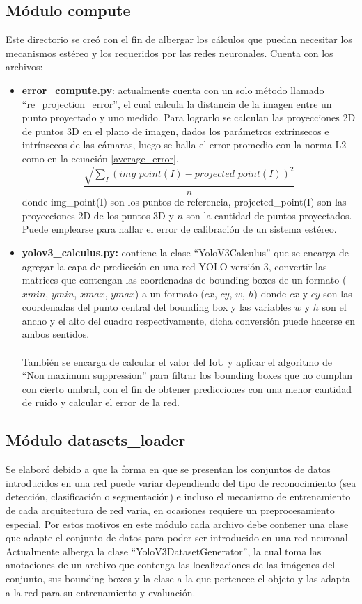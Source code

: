 \subsection{Módulo compute}
Este directorio se creó con el fin de albergar los cálculos que puedan necesitar los mecanismos estéreo y los requeridos por las redes neuronales. Cuenta con los archivos:
\begin{itemize}
    \item \textbf{error\_compute.py}: actualmente cuenta con un solo método llamado \\``re\_projection\_error'', el cual calcula la distancia de la imagen entre un punto proyectado y uno medido. Para lograrlo se calculan las proyecciones 2D de puntos 3D en el plano de imagen, dados los parámetros extrínsecos e intrínsecos de las cámaras, luego se halla el error promedio con la norma L2 como en la ecuación \ref{average_error}.
    \begin{equation}
        \frac{\sqrt{\sum_{I} (img\_point(I) - projected\_point(I))^{2}}}{n} \label{average_error}
    \end{equation}
    donde img\_point(I) son los puntos de referencia, projected\_point(I) son las proyecciones 2D de los puntos 3D y $n$ son la cantidad de puntos proyectados. Puede emplearse para hallar el error de calibración de un sistema estéreo.
    \item \textbf{yolov3\_calculus.py:} contiene la clase ``YoloV3Calculus'' que se encarga de agregar la capa de predicción en una red YOLO versión 3, convertir las matrices que contengan las coordenadas de bounding boxes de un formato ($xmin$, $ymin$, $xmax$, $ymax$) a un formato ($cx$, $cy$, $w$, $h$) donde $cx$ y $cy$ son las coordenadas del punto central del bounding box y las variables $w$ y $h$ son el ancho y el alto del cuadro respectivamente, dicha conversión puede hacerse en ambos sentidos.
    \\
    \\
    También se encarga de calcular el valor del IoU y aplicar el algoritmo de ``Non maximum suppression'' para filtrar los bounding boxes que no cumplan con cierto umbral, con el fin de obtener predicciones con una menor cantidad de ruido y calcular el error de la red.
\end{itemize}
\subsection{Módulo datasets\_loader}
Se elaboró debido a que la forma en que se presentan los conjuntos de datos introducidos en una red puede variar dependiendo del tipo de reconocimiento (sea detección, clasificación o segmentación) e incluso el mecanismo de entrenamiento de cada arquitectura de red varia, en ocasiones requiere un preprocesamiento especial. Por estos motivos en este módulo cada archivo debe contener una clase que adapte el conjunto de datos para poder ser introducido en una red neuronal. Actualmente alberga la clase ``YoloV3DatasetGenerator'', la cual toma las anotaciones de un archivo que contenga las localizaciones de las imágenes del conjunto, sus bounding boxes y la clase a la que pertenece el objeto y las adapta a la red para su entrenamiento y evaluación.  

